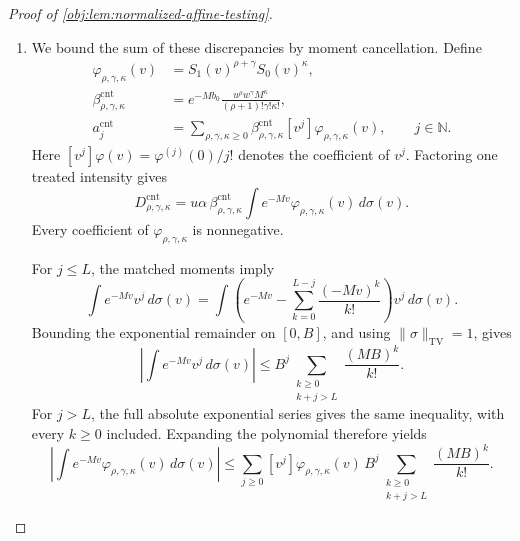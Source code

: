 \begin{proof}[Proof of \cref{obj:lem:normalized-affine-testing}]
\begin{enumerate}
\item
We bound the sum of these discrepancies by moment cancellation. Define
\[
\begin{aligned}
\varphi_{\rho,\gamma,\kappa}(v)
&=S_1(v)^{\rho+\gamma}S_0(v)^\kappa,\\
\beta_{\rho,\gamma,\kappa}^{\mathrm{cnt}}
&=e^{-Mb_0}
  \frac{u^\rho w^\gamma M^\kappa}{(\rho+1)!\gamma!\kappa!},\\
a_j^{\mathrm{cnt}}
&=\sum_{\rho,\gamma,\kappa\ge0}
  \beta_{\rho,\gamma,\kappa}^{\mathrm{cnt}}
  [v^j]\varphi_{\rho,\gamma,\kappa}(v),
\qquad j\in\mathbb N.
\end{aligned}
\]
Here \([v^j]\varphi(v)=\varphi^{(j)}(0)/j!\) denotes the coefficient of \(v^j\). Factoring one treated intensity gives
\[
D_{\rho,\gamma,\kappa}^{\mathrm{cnt}}
=u\alpha\,\beta_{\rho,\gamma,\kappa}^{\mathrm{cnt}}
\int e^{-Mv}\varphi_{\rho,\gamma,\kappa}(v)\,d\sigma(v).
\]
Every coefficient of \(\varphi_{\rho,\gamma,\kappa}\) is nonnegative.

For \(j\le L\), the matched moments imply
\[
\int e^{-Mv}v^j\,d\sigma(v)
=
\int\left(e^{-Mv}
-\sum_{k=0}^{L-j}\frac{(-Mv)^k}{k!}\right)v^j\,d\sigma(v).
\]
Bounding the exponential remainder on \([0,B]\), and using
\(\|\sigma\|_{\mathrm{TV}}=1\), gives
\[
\left|\int e^{-Mv}v^j\,d\sigma(v)\right|
\le B^j\sum_{\substack{k\ge0\\k+j>L}}\frac{(MB)^k}{k!}.
\]
For \(j>L\), the full absolute exponential series gives the same inequality, with every \(k\ge0\) included. Expanding the polynomial therefore yields
\[
\left|\int e^{-Mv}\varphi_{\rho,\gamma,\kappa}(v)\,d\sigma(v)\right|
\le
\sum_{j\ge0}[v^j]\varphi_{\rho,\gamma,\kappa}(v)\,
B^j\sum_{\substack{k\ge0\\k+j>L}}\frac{(MB)^k}{k!}.
\]


\end{enumerate}
\end{proof}
